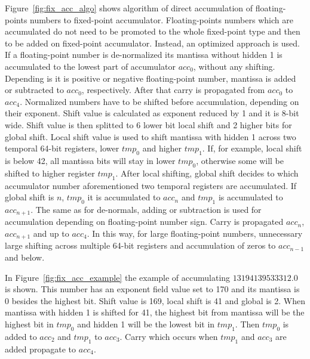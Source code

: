 \documentclass[conference]{IEEEtran}
\begin{document}
\par
Figure~\ref{fig:fix_acc_algo} shows algorithm of direct accumulation of floating-points numbers to fixed-point accumulator.
Floating-points numbers which are accumulated do not need to be promoted to the whole fixed-point type 
and then to be added on fixed-point accumulator.
Instead, an optimized approach is used.
If a floating-point number is de-normalized its mantissa without hidden 1 is accumulated to the lowest part of accumulator $acc_0$, 
without any shifting.
Depending is it is positive or negative floating-point number, mantissa is added or subtracted to $acc_0$, respectively.
After that carry is propagated from $acc_0$ to $acc_4$.
Normalized numbers have to be shifted before accumulation, depending on their exponent. 
Shift value is calculated as exponent reduced by 1 and it is 8-bit wide.
Shift value is then splitted to 6 lower bit local shift and 2 higher bits for global shift.
Local shift value is used to shift mantissa with hidden 1 across two temporal 64-bit registers, 
lower $tmp_0$ and higher $tmp_1$.
If, for example, local shift is below 42, all mantissa bits will stay in lower $tmp_0$, 
otherwise some will be shifted to higher register $tmp_1$.
After local shifting, global shift decides to which accumulator number aforementioned two temporal registers are accumulated.
If global shift is $n$, $tmp_0$ it is accumulated to $acc_n$
and $tmp_1$ is accumulated to $acc_{n+1}$.
The same as for de-normals, adding or subtraction is used for accumulation depending on floating-point number sign.
Carry is propagated $acc_n$, $acc_{n+1}$ and up to $acc_4$.
In this way, for large floating-point numbers,
unnecessary large shifting across multiple 64-bit registers and accumulation of zeros to $acc_{n-1}$ and below.
\par
In Figure~\ref{fig:fix_acc_example} the example of accumulating $13194139533312.0$ is shown. 
This number has an exponent field value set to 170 and its mantissa is 0 besides the highest bit.
Shift value is 169, local shift is 41 and global is 2.
When mantissa with hidden 1 is shifted for 41, the highest bit from mantissa will be the highest bit in $tmp_0$
and hidden 1 will be the lowest bit in $tmp_1$.
Then $tmp_0$ is added to $acc_2$ and $tmp_1$ to $acc_3$.
Carry which occurs when $tmp_1$ and $acc_3$ are added propagate to $acc_4$.
\end{document}
